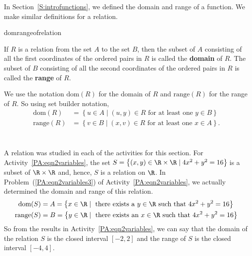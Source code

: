 In Section~\ref{S:introfunctions}, we defined the domain and range of a function.  We make similar definitions for a relation.

\begin{defbox}{domrangeofrelation}{If  $R$ is a relation from the set  $A$  to the set  $B$, then the subset of  $A$  consisting of all the first coordinates of the ordered pairs in  $R$  is called the \textbf{domain}
%
%
 of  $R$.  The subset of  $B$  consisting of all the second coordinates of the ordered pairs in  $R$  is called the \textbf{range}
%
%
 of  $R$.  

\newpar
We use the notation $\text{dom}( R )$ for the domain of $R$ and  $\text{range}( R )$ for the range of $R$.  So using set builder notation, \label{sym:domrel}
\begin{align*}
  \text{dom} ( R )   &= \left\{ { {u \in A } \mid \left( {u, y} \right) \in R\text{ for at least one }y \in B} \right\}  \\ 
  \text{range} ( R ) &= \left\{ { {v \in B } \mid \left( {x, v} \right) \in R\text{ for at least one }x \in A} \right\}\!.  \label{sym:rangerel} \\ 
\end{align*}
}
\end{defbox}
%
\begin{example}\label{exam:relation} \hfill \\
A relation was studied in each of the \typel activities for this section.
For \typeu Activity~\ref*{PA:eqn2variables}, the set $S = \left\{ (x, y) \in \R \times \R \mid 4x^2 + y^2 = 16 \right\}\!$
 is a subset of $\R \times \R$ and, hence, $S$ is a relation on $\R$.  In Problem~(\ref{PA:eqn2variables3}) of 
\typeu Activity~\ref*{PA:eqn2variables}, we actually determined the domain and range of this relation.
\begin{align*}
\text{dom}(S) &= A = \left\{ x \in \R \mid \text{ there exists a } y \in \R \text{ such that } 4x^2 + y^2 = 16 \right\} \\
\text{range}(S) &= B = \left\{ y \in \R \mid \text{ there exists an } x \in \R \text{ such that } 4x^2 + y^2 = 16 \right\}
\end{align*}
So from the results in \typeu Activity~\ref*{PA:eqn2variables}, we can say that the domain of the relation $S$ is the closed interval $\left[ -2, 2 \right]$ and the range of $S$ is the closed interval $\left[ -4, 4 \right]$.
\end{example}
